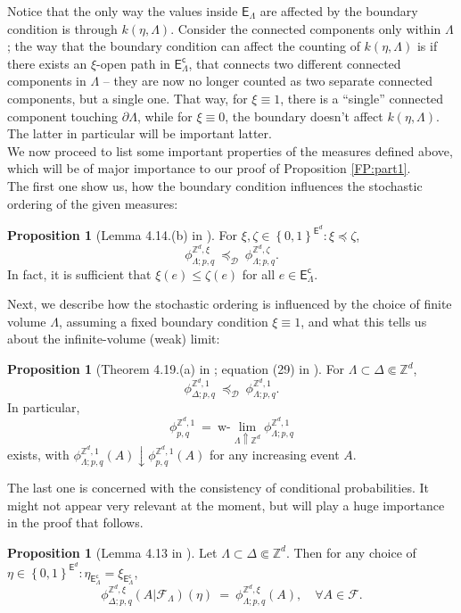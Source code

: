 \documentclass[12pt]{article}
\newcommand{\D}{\mathcal{D}}
\newcommand{\E}{\mathsf{E}}
\newcommand{\F}{\mathcal{F}}
\newcommand{\Z}{\mathbb{Z}}
\newcommand{\set}[1]{\left\{#1\right\}}
\newcommand{\1}{\mathbbm{1}}
\renewcommand{\c}{\mathsf{c}}
\newcommand{\5}{\vspace{0.5cm}}
\theoremstyle{definition}
\newtheorem{prop}[thm]{Proposition}
\begin{document}
Notice that the only way the values inside $\E_\Lambda$ are affected by the boundary condition is through $k(\eta,\Lambda)$. Consider the connected components only within $\Lambda$; the way that the boundary condition can affect the counting of $k(\eta,\Lambda)$ is if there exists an $\xi$-open path in $\E_\Lambda^\c$, that connects two different connected components in $\Lambda$ -- they are now no longer counted as two separate connected components, but a single one. That way, for $\xi\equiv 1$, there is a ``single'' connected component touching $\partial\Lambda$, while for $\xi\equiv 0$, the boundary doesn't affect $k(\eta,\Lambda)$. The latter in particular will be important latter. \\

We now proceed to list some important properties of the measures defined above, which will be of major importance to our proof of Proposition \ref{FP:part1}.  \\

The first one show us, how the boundary condition influences the stochastic ordering of the given measures:
\begin{prop}[Lemma 4.14.(b) in \cite{Gri}]\label{RC:boundarydomination}
For $\xi,\zeta\in\set{0,1}^{\E^d}:\xi\preceq\zeta$,
$$\phi_{\Lambda;p,q}^{\Z^d,\xi} ~\preceq_\D~ \phi_{\Lambda;p,q}^{\Z^d,\zeta}.$$
In fact, it is sufficient that $\xi(e)\leq\zeta(e)$ for all $e\in\E_\Lambda^\c$.
\end{prop}

Next, we describe how the stochastic ordering is influenced by the choice of finite volume $\Lambda$, assuming a fixed boundary condition $\xi\equiv 1$, and what this tells us about the infinite-volume (weak) limit:
\begin{prop}[Theorem 4.19.(a) in \cite{Gri}; equation (29) in \cite{GHM}]\label{RC:decr converg}
For $\Lambda\subset\Delta\Subset\Z^d$,
$$\phi_{\Delta;p,q}^{\Z^d,1} ~\preceq_\D~ \phi_{\Lambda;p,q}^{\Z^d,1}.$$
In particular,
$$\phi_{p,q}^{\Z^d,1} ~=~ \text{w-}\!\!\lim_{\Lambda\Uparrow\Z^d}\phi_{\Lambda;p,q}^{\Z^d,1}$$
exists, with $\phi_{\Lambda;p,q}^{\Z^d,1}(A)\downarrow\phi_{p,q}^{\Z^d,1}(A)$ for any increasing event $A$.
\end{prop}
The last one is concerned with the consistency of conditional probabilities. It might not appear very relevant at the moment, but will play a huge importance in the proof that follows.
\begin{prop}[Lemma 4.13 in \cite{Gri}]\label{RC:conditionalconsisteny}
Let $\Lambda\subset\Delta\Subset\Z^d$. Then for any choice of $\eta\in\set{0,1}^{\E^d}:\eta_{\E_\Lambda^\c}=\xi_{\E_\Lambda^\c}$,
$$\phi_{\Delta;p,q}^{\Z^d,\xi}(A|\F_\Lambda)(\eta) ~=~ \phi_{\Lambda;p,q}^{\Z^d,\xi}(A), \quad \forall A\in\F.$$
\end{prop}
\end{document}
